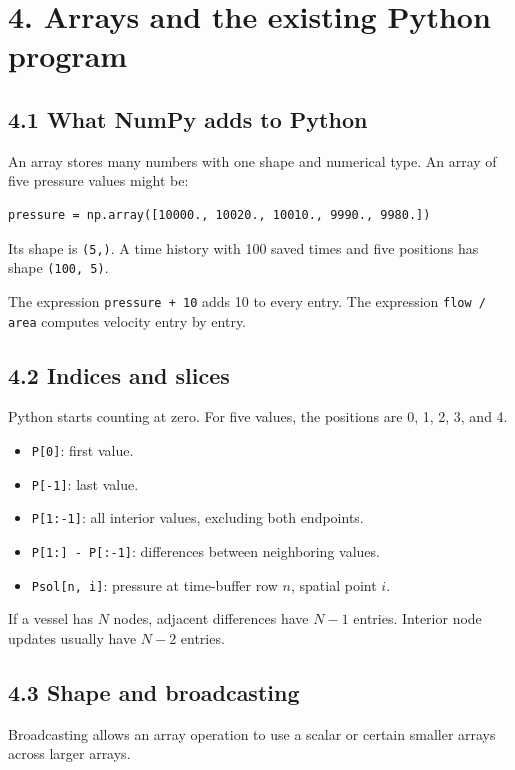 \documentclass[11pt,a4paper]{article}
\begin{document}
\clearpage
\section{4. Arrays and the existing Python program}
\subsection{4.1 What NumPy adds to Python}
An array stores many numbers with one shape and numerical type. An array of five pressure values might be:


\begin{lstlisting}
pressure = np.array([10000., 10020., 10010., 9990., 9980.])
\end{lstlisting}
Its shape is \texttt{(5,)}. A time history with 100 saved times and five positions has shape \texttt{(100, 5)}.

The expression \texttt{pressure + 10} adds 10 to every entry. The expression \texttt{flow /\allowbreak{} area} computes velocity entry by entry.

\subsection{4.2 Indices and slices}
Python starts counting at zero. For five values, the positions are 0, 1, 2, 3, and 4.


\begin{itemize}
\item \texttt{P[0]}: first value.


\item \texttt{P[-1]}: last value.


\item \texttt{P[1:-1]}: all interior values, excluding both endpoints.


\item \texttt{P[1:] - P[:-1]}: differences between neighboring values.


\item \texttt{Psol[n, i]}: pressure at time-buffer row \(n\), spatial point \(i\).


\end{itemize}
If a vessel has \(N\) nodes, adjacent differences have \(N-1\) entries. Interior node updates usually have \(N-2\) entries.

\subsection{4.3 Shape and broadcasting}
Broadcasting allows an array operation to use a scalar or certain smaller arrays across larger arrays.
\end{document}
